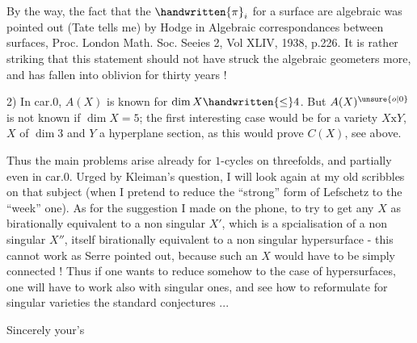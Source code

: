By the way, the fact that the $\handwritten{\pi}_{i}$ for a surface are algebraic was
pointed out (Tate tells me) by Hodge in Algebraic correspondances between
surfaces, Proc. London Math. Soc. Seeies 2, Vol XLIV, 1938, p.226. It is
rather striking that this statement should not have struck the algebraic
geometers more, and has fallen into oblivion for  thirty years !

2) In car.$0$, $A(X)$ is known for $\dim X\handwritten{\leq}4$. But $A(X)^{\unsure{o|0}}$ is not known if
$\dim X=5$; the first interesting case would be for a variety $X\mathbin{\mathrm{x}}Y$, $X$
of $\dim 3$ and $Y$ a hyperplane section, as this would prove $C(X)$, see above.

Thus the main problems arise already for $1$-cycles on threefolds,
and partially even in car.$0$. Urged by Kleiman's question, I will look
again at my old scribbles on that subject (when I pretend to reduce the
``strong'' form of Lefschetz to the ``week'' one). As for the suggestion I
made on the phone, to try to get any $X$ as birationally equivalent to a
non singular $X'$, which is a spcialisation of a non singular $X''$, itself
birationally equivalent to a non singular hypersurface - this cannot
work as Serre pointed out, because such an $X$ would have to be simply connected !
Thus if one wants to reduce somehow to the case of hypersurfaces,
one will have to work also with singular ones, and see how to reformulate
for singular varieties the standard conjectures ...

Sincerely your's\\

